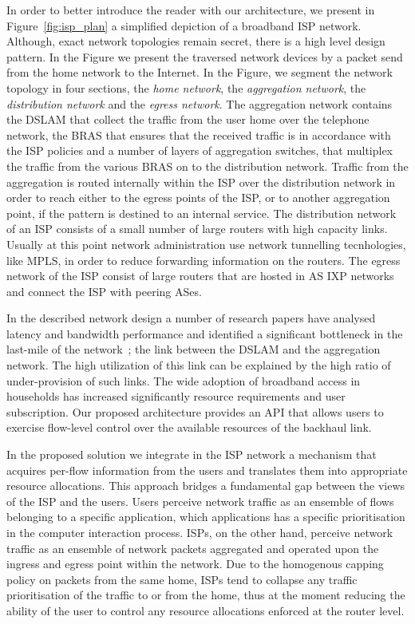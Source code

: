 In order to better introduce the reader with our architecture, we present in
Figure~\ref{fig:isp_plan} a simplified depiction of a broadband ISP network.
Although, exact network topologies remain secret, there is a high level design
pattern. In the Figure we present the traversed network devices by a packet send
from the home network to the Internet.  In the Figure, we segment the network
topology in four sections, the {\it home network}, the {\it aggregation
  network}, the {\it distribution network} and the {\it egress network}. The
aggregation network contains the DSLAM that collect the traffic from the user
home over the telephone network, the BRAS that ensures that the received traffic
is in accordance with the ISP policies and a number of layers of aggregation
switches, that multiplex the traffic from the various BRAS on to the
distribution network. Traffic from the aggregation is routed internally within
the ISP over the distribution network in order to reach either to the egress
points of the ISP, or to another aggregation point, if the pattern is destined
to an internal service. The distribution network of an ISP consists of a small
number of large routers with high capacity links. Usually at this point network
administration use network tunnelling tecnhologies, like MPLS, in order to
reduce forwarding information on the routers.  The egress network of the ISP
consist of large routers that are hosted in AS IXP networks and connect the ISP
with peering ASes. 

In the described network design a number of research papers have analysed
latency and bandwidth performance and identified a significant bottleneck in the
last-mile of the network~\cite{Dischinger:2007bg,Akella2003}; the link between
the DSLAM and the aggregation network. The high utilization of this link can be
explained by the high ratio of under-provision of such links. The wide adoption
of broadband access in households has increased significantly resource
requirements and user subscription. Our proposed architecture provides an API
that allows users to exercise flow-level control over the available resources of
the backhaul link.

In the proposed solution we integrate in the ISP network a mechanism that
acquires per-flow information from the users and translates them into
appropriate resource allocations. This approach bridges a fundamental gap
between the views of the ISP and the users. Users perceive network traffic as an
ensemble of flows belonging to a specific application, which applications has a
specific prioritisation in the computer interaction process.  ISPs, on the other
hand, perceive network traffic as an ensemble of network packets aggregated and
operated upon the ingress and egress point within the network. Due to the
homogenous capping policy on packets from the same home, ISPs tend to collapse
any traffic prioritisation of the traffic to or from the home, thus at the
moment reducing the ability of the user to control any resource allocations
enforced at the router level. 

